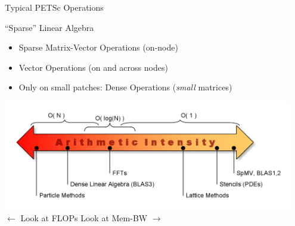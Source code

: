 

\begin{frame}{Typical PETSc Operations}
 
  \begin{block}{``Sparse'' Linear Algebra}
   \begin{itemize}
    \item Sparse Matrix-Vector Operations (on-node)
    \item Vector Operations (on and across nodes)
    \item Only on small patches: Dense Operations (\emph{small} matrices)
   \end{itemize}
  \end{block}

   \begin{center}
     \includegraphics[width=0.95\textwidth]{figures/OlikerArithmeticIntensity.png} \\
    $\leftarrow$ Look at FLOPs \hspace{3cm} Look at Mem-BW $\rightarrow$
   \end{center}

\end{frame}


